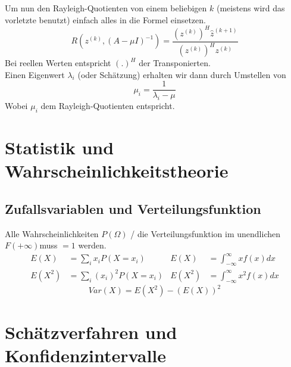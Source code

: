 \documentclass[
ngerman,
accentcolor=9c,%
type=intern,
marginpar=false
]{tudapub}
\begin{document}
            Um nun den Rayleigh-Quotienten von einem beliebigen $k$ (meistens wird das vorletzte benutzt) einfach alles in die Formel einsetzen.
            \begin{equation*}
                R(z^{(k)}, (A - \mu I)^{-1}) = \dfrac{(z^{(k)})^H\hat{z}^{(k+1)}}{(z^{(k)})^Hz^{(k)}}
            \end{equation*}
            Bei reellen Werten entspricht $(.)^H$ der Transponierten.\\
            Einen Eigenwert $\lambda_i$ (oder Schätzung) erhalten wir dann durch Umstellen von
            \begin{equation*}
                \mu_i = \dfrac{1}{\lambda_i - \mu}
            \end{equation*}
            Wobei $\mu_i$ dem Rayleigh-Quotienten entspricht.
    \newpage
    \section{Statistik und Wahrscheinlichkeitstheorie}
        \subsection{Zufallsvariablen und Verteilungsfunktion}
            Alle Wahrscheinlichkeiten $P(\Omega)$ / die Verteilungsfunktion im unendlichen $F(+\infty)$\hspace{1.5ex}muss $=1$ werden.\\
            \begin{align*}
                E(X) &= \sum_i x_i P(X=x_i) &
                E(X) &= \int_{-\infty}^\infty x f(x) dx\\
                E(X^2) &= \sum_i (x_i)^2 P(X=x_i) &
                E(X^2) &= \int_{-\infty}^\infty x^2 f(x) dx
            \end{align*}
            \begin{equation*}
                Var(X) = E(X^2) - (E(X))^2
            \end{equation*}

    \newpage
    \section{Schätzverfahren und Konfidenzintervalle}
\end{document}

